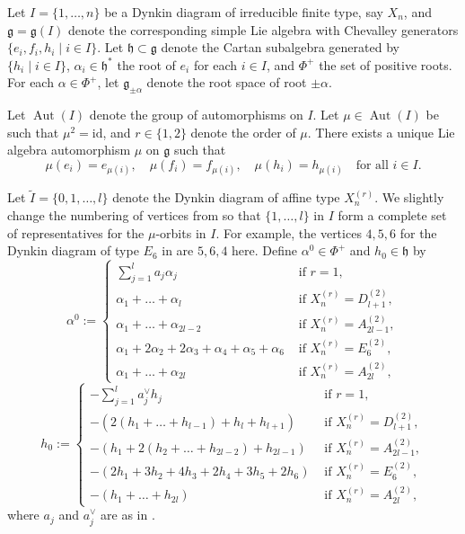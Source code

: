 \documentclass[12pt,a4paper]{amsart}
\theoremstyle{definition}
\numberwithin{equation}{subsection}
\begin{document}
Let $I = \{ 1,\dots,n \}$ be a Dynkin diagram of irreducible finite type, say $X_n$, and $\mathfrak{g} = \mathfrak{g}(I)$ denote the corresponding simple Lie algebra with Chevalley generators $\{ e_i,f_i,h_i \mid i \in I \}$.
Let $\mathfrak{h} \subset \mathfrak{g}$ denote the Cartan subalgebra generated by $\{ h_i \mid i \in I \}$, $\alpha_i \in \mathfrak{h}^*$ the root of $e_i$ for each $i \in I$, and $\Phi^+$ the set of positive roots.
For each $\alpha \in \Phi^+$, let $\mathfrak{g}_{\pm \alpha}$ denote the root space of root $\pm \alpha$.

Let $\operatorname{Aut}(I)$ denote the group of automorphisms on $I$.
Let $\mu \in \operatorname{Aut}(I)$ be such that $\mu^2 = \mathrm{id}$, and $r \in \{ 1,2 \}$ denote the order of $\mu$.
There exists a unique Lie algebra automorphism $\mu$ on $\mathfrak{g}$ such that
\[
  \mu(e_i) = e_{\mu(i)}, \quad \mu(f_i) = f_{\mu(i)}, \quad \mu(h_i) = h_{\mu(i)} \text{ } \text{ for all } i \in I.
\]

Let $\tilde{I} = \{ 0,1,\dots,l \}$ denote the Dynkin diagram of affine type $X_n^{(r)}$.
We slightly change the numbering of vertices from \cite{Kac83} so that $\{ 1,\dots,l \}$ in $I$ form a complete set of representatives for the $\mu$-orbits in $I$.
For example, the vertices $4,5,6$ for the Dynkin diagram of type $E_6$ in \cite{Kac83} are $5,6,4$ here.
Define $\alpha^0 \in \Phi^+$ and $h_0 \in \mathfrak{h}$ by
\[
  \alpha^0 := \begin{cases}
    \sum_{j=1}^l a_j \alpha_j & \text{ if } r = 1, \\
    \alpha_1 + \dots + \alpha_l & \text{ if } X_n^{(r)} = D_{l+1}^{(2)}, \\
    \alpha_1 + \dots + \alpha_{2l-2} & \text{ if } X_n^{(r)} = A_{2l-1}^{(2)}, \\
    \alpha_1 + 2\alpha_2 + 2\alpha_3 + \alpha_4 + \alpha_5 + \alpha_6 & \text{ if } X_n^{(r)} = E_{6}^{(2)}, \\
    \alpha_1 + \dots + \alpha_{2l} & \text{ if } X_n^{(r)} = A_{2l}^{(2)},
  \end{cases}
\]
\[
  h_0 := \begin{cases}
    -\sum_{j=1}^l a_j^\vee h_j & \text{ if } r = 1, \\
    -(2(h_1 + \dots + h_{l-1}) + h_l + h_{l+1}) & \text{ if } X_n^{(r)} = D_{l+1}^{(2)}, \\
    -(h_1 + 2(h_2 + \dots + h_{2l-2}) + h_{2l-1}) & \text{ if } X_n^{(r)} = A_{2l-1}^{(2)}, \\
    -(2h_1 + 3h_2 + 4h_3 +2h_4 +3h_5 + 2h_6) & \text{ if } X_n^{(r)} = E_{6}^{(2)}, \\
    -(h_1 + \dots + h_{2l}) & \text{ if } X_n^{(r)} = A_{2l}^{(2)},
  \end{cases}
\]
where $a_j$ and $a_j^\vee$ are as in \cite[Sections 4.8, 6.1]{Kac83}.
\end{document}
